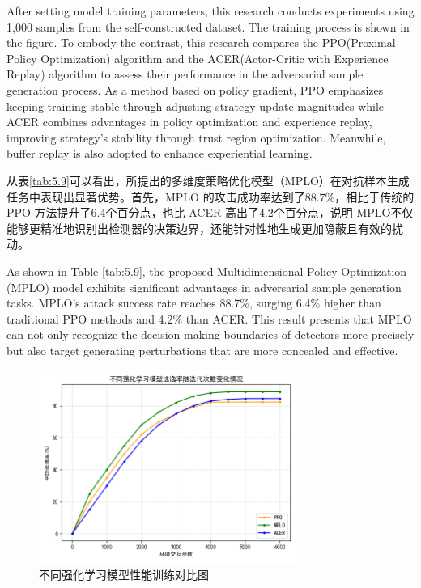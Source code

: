 After setting model training parameters, this research conducts experiments using 1,000 samples from the self-constructed dataset. The training process is shown in the figure. To embody the contrast, this research compares the PPO(Proximal Policy Optimization) algorithm and the ACER(Actor-Critic with Experience Replay)\cite{wang2016sample} algorithm to assess their performance in the adversarial sample generation process. As a method based on policy gradient, PPO emphasizes keeping training stable through adjusting strategy update magnitudes while ACER combines advantages in policy optimization and experience replay, improving strategy's stability through trust region optimization. Meanwhile, buffer replay is also adopted to enhance experiential learning.

从表\ref{tab:5.9}可以看出，所提出的多维度策略优化模型（MPLO）在对抗样本生成任务中表现出显著优势。首先，MPLO 的攻击成功率达到了88.7\%，相比于传统的PPO 方法提升了6.4个百分点，也比 ACER 高出了4.2个百分点，说明 MPLO不仅能够更精准地识别出检测器的决策边界，还能针对性地生成更加隐蔽且有效的扰动。

As shown in Table \ref{tab:5.9}, the proposed Multidimensional Policy Optimization (MPLO) model exhibits significant advantages in adversarial sample generation tasks. MPLO's attack success rate reaches 88.7\%, surging 6.4\% higher than traditional PPO methods and 4.2\% than ACER. This result presents that MPLO can not only recognize the decision-making boundaries of detectors more precisely but also target generating perturbations that are more concealed and effective.
\begin{figure}[hbt]
	\centering
	\includegraphics[width=0.75\textwidth]{figures/5.1}
	\caption{不同强化学习模型性能训练对比图}\label{fig:5.1}
\end{figure}

